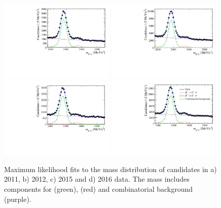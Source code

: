\begin{figure}[t!]
  \centering
    \includegraphics[width=0.49\textwidth]{./Figs/LifetimeMeasurement/Bd2KPi_2011_mass_fit.pdf}
    \includegraphics[width=0.49\textwidth]{./Figs/LifetimeMeasurement/Bd2KPi_2012_mass_fit.pdf}
    \includegraphics[width=0.49\textwidth]{./Figs/LifetimeMeasurement/Bd2KPi_2015_mass_fit.pdf}
    \includegraphics[width=0.49\textwidth]{./Figs/LifetimeMeasurement/Bd2KPi_2016_mass_fit.pdf}
  \caption{Maximum likelihood fits to the mass distribution of \bdkpi candidates in a) 2011, b) 2012, c) 2015 and d) 2016 data. The mass \pdf includes components for \bdkpi (green), \bskpi (red) and combinatorial background (purple).}
  \label{fig:ntracksmassifts}
\end{figure}
\FloatBarrier




